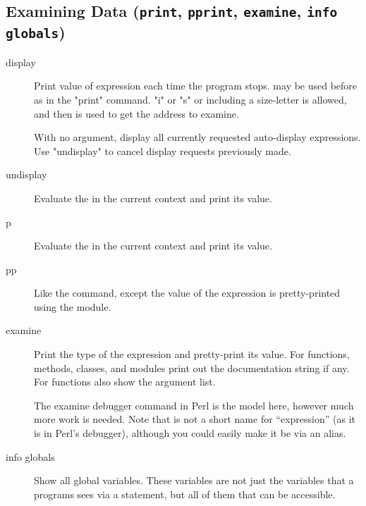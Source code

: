 \subsection{Examining Data ({\tt print}, {\tt pprint}, {\tt examine}, {\tt info globals})\label{subsection-data}}

\begin{description}

\item[display  ]

Print value of expression  each time the program
stops.   may be used before  as in the
"print" command.   "i" or "s" or including a size-letter
is allowed, and then  is used to get the address to
examine.

With no argument, display all currently requested auto-display
expressions.  Use "undisplay" to cancel display requests previously
made.

\item[undisplay  ]

Evaluate the  in the current context and print its
value.  


\item[p ]

Evaluate the  in the current context and print its
value.  

\item[pp ]

Like the  command, except the value of the expression is
pretty-printed using the  module.

\item[examine ]

Print the type of the expression and pretty-print its value.  For
functions, methods, classes, and modules print out the documentation
string if any.  For functions also show the argument list.

The examine debugger command in Perl is the model here, however much
more work is needed. Note that  is not a short name for
``expression'' (as it is in Perl's debugger), although you could
easily make it be via an alias.

\item[info globals]\label{command:info-globals}

Show all global variables. These variables are not just the variables
that a programs sees via a  statement, but all of them
that can be accessible.

\end{description}


